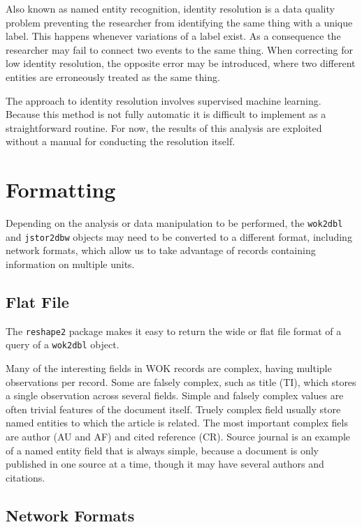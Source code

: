Also known as named entity recognition, identity resolution is a data
quality problem preventing the researcher from identifying the same
thing with a unique label. This happens whenever variations of a label
exist. As a consequence the researcher may fail to connect two events to
the same thing. When correcting for low identity resolution, the
opposite error may be introduced, where two different entities are
erroneously treated as the same thing.

The approach to identity resolution involves supervised machine
learning. Because this method is not fully automatic it is difficult to
implement as a straightforward routine. For now, the results of this
analysis are exploited without a manual for conducting the resolution
itself.

\section{Formatting}\label{formatting}

Depending on the analysis or data manipulation to be performed, the
\texttt{wok2dbl} and \texttt{jstor2dbw} objects may need to be converted
to a different format, including network formats, which allow us to take
advantage of records containing information on multiple units.

\subsection{Flat File}\label{flat-file}

The \texttt{reshape2} package makes it easy to return the wide or flat
file format of a query of a \texttt{wok2dbl} object.

Many of the interesting fields in WOK records are complex, having
multiple observations per record. Some are falsely complex, such as
title (TI), which stores a single observation across several fields.
Simple and falsely complex values are often trivial features of the
document itself. Truely complex field usually store named entities to
which the article is related. The most important complex fiels are
author (AU and AF) and cited reference (CR). Source journal is an
example of a named entity field that is always simple, because a
document is only published in one source at a time, though it may have
several authors and citations.

\subsection{Network Formats}\label{network-formats}

